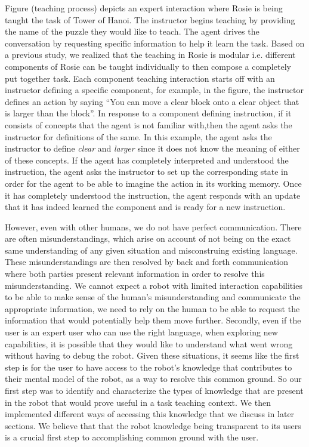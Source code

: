 \documentclass[letterpaper]{article}
\begin{document}
Figure (teaching process) depicts an expert interaction where Rosie is being taught the task of Tower of Hanoi. The instructor begins teaching by providing the name of the puzzle they would like to teach. The agent drives the conversation by requesting specific information to help it learn the task. Based on a previous study, we realized that the teaching in Rosie is modular i.e. different components of Rosie can be taught individually to then compose a completely put together task. Each component teaching interaction starts off with an instructor defining a specific component, for example, in the figure, the instructor defines an action by saying ``You can move a clear block onto a clear object that is larger than the block''. In response to a component defining instruction, if it consists of concepts that the agent is not familiar with,then the agent asks the instructor for definitions of the same. In this example, the agent asks the instructor to define \emph{clear} and \emph{larger} since it does not know the meaning of either of these concepts. If the agent has completely interpreted and understood the instruction, the agent asks the instructor to set up the corresponding state in order for the agent to be able to imagine the action in its working memory. Once it has completely understood the instruction, the agent responds with an update that it has indeed learned the component and is ready for a new instruction. 

However, even with other humans, we do not have perfect communication. There are often misunderstandings, which arise on account of not being on the exact same understanding of any given situation and misconstruing existing language. These misunderstandings are then resolved by back and forth communication where both parties present relevant information in order to resolve this misunderstanding. We cannot expect a robot with limited interaction capabilities to be able to make sense of the human's misunderstanding and communicate the appropriate information, we need to rely on the human to be able to request the information that would potentially help them move further. Secondly, even if the user is an expert user who can use the right language, when exploring new capabilities, it is possible that they would like to understand what went wrong without having to debug the robot. Given these situations, it seems like the first step is for the user to have access to the robot's knowledge that contributes to their mental model of the robot, as a way to resolve this common ground. So our first step was to identify and characterize the types of knowledge that are present in the robot that would prove useful in a task teaching context. We then implemented different ways of accessing this knowledge that we discuss in later sections. We believe that that the robot knowledge being transparent to its users is a crucial first step to accomplishing common ground with the user.
\end{document}
